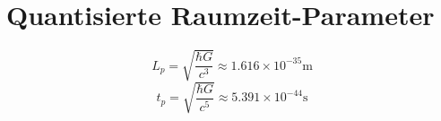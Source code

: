 \section{Quantisierte Raumzeit-Parameter}
\[ L_p = \sqrt{\frac{\hbar G}{c^3}} \approx 1.616 \times 10^{-35} \text{m} \]
\[ t_p = \sqrt{\frac{\hbar G}{c^5}} \approx 5.391 \times 10^{-44} \text{s} \]